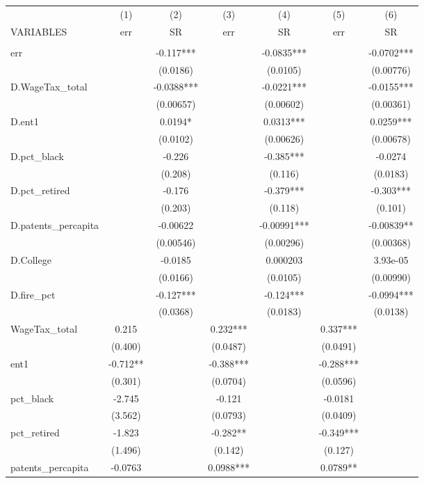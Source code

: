\begin{tabular}{lcccccc} \hline
 & (1) & (2) & (3) & (4) & (5) & (6) \\
VARIABLES & err & SR & err & SR & err & SR \\ \hline
 &  &  &  &  &  &  \\
err &  & -0.117*** &  & -0.0835*** &  & -0.0702*** \\
 &  & (0.0186) &  & (0.0105) &  & (0.00776) \\
D.WageTax\_total &  & -0.0388*** &  & -0.0221*** &  & -0.0155*** \\
 &  & (0.00657) &  & (0.00602) &  & (0.00361) \\
D.ent1 &  & 0.0194* &  & 0.0313*** &  & 0.0259*** \\
 &  & (0.0102) &  & (0.00626) &  & (0.00678) \\
D.pct\_black &  & -0.226 &  & -0.385*** &  & -0.0274 \\
 &  & (0.208) &  & (0.116) &  & (0.0183) \\
D.pct\_retired &  & -0.176 &  & -0.379*** &  & -0.303*** \\
 &  & (0.203) &  & (0.118) &  & (0.101) \\
D.patents\_percapita &  & -0.00622 &  & -0.00991*** &  & -0.00839** \\
 &  & (0.00546) &  & (0.00296) &  & (0.00368) \\
D.College &  & -0.0185 &  & 0.000203 &  & 3.93e-05 \\
 &  & (0.0166) &  & (0.0105) &  & (0.00990) \\
D.fire\_pct &  & -0.127*** &  & -0.124*** &  & -0.0994*** \\
 &  & (0.0368) &  & (0.0183) &  & (0.0138) \\
WageTax\_total & 0.215 &  & 0.232*** &  & 0.337*** &  \\
 & (0.400) &  & (0.0487) &  & (0.0491) &  \\
ent1 & -0.712** &  & -0.388*** &  & -0.288*** &  \\
 & (0.301) &  & (0.0704) &  & (0.0596) &  \\
pct\_black & -2.745 &  & -0.121 &  & -0.0181 &  \\
 & (3.562) &  & (0.0793) &  & (0.0409) &  \\
pct\_retired & -1.823 &  & -0.282** &  & -0.349*** &  \\
 & (1.496) &  & (0.142) &  & (0.127) &  \\
patents\_percapita & -0.0763 &  & 0.0988*** &  & 0.0789** &  \\

\end{tabular}
